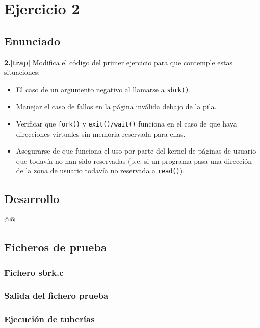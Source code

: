 \section{Ejercicio 2}
\subsection{Enunciado}
\begin{ejer}
    \textbf{2.[trap]} Modifica el código del primer ejercicio para que contemple estas situaciones:
    \begin{itemize}
        \item El caso de un argumento negativo al llamarse a \texttt{sbrk()}.
        \item Manejar el caso de fallos en la página inválida debajo de la pila.
        \item Verificar que \texttt{fork()} y \texttt{exit()/wait()} funciona en el caso de que haya
    direcciones virtuales sin memoria reservada para ellas.
        \item Asegurarse de que funciona el uso por parte del kernel de páginas de usuario que todavía no han sido 
    reservadas (p.e. si un programa pasa una dirección de la zona de usuario todavía no reservada a \texttt{read()}).
    \end{itemize}
\end{ejer}
\subsection{Desarrollo}
\begin{listing}
@@
\end{listing}

\subsection{Ficheros de prueba}
\subsubsection{Fichero sbrk.c}
\subsubsection{Salida del fichero prueba}
\begin{listing}[style=consola]
$:
\end{listing}
\subsubsection{Ejecución de tuberías}